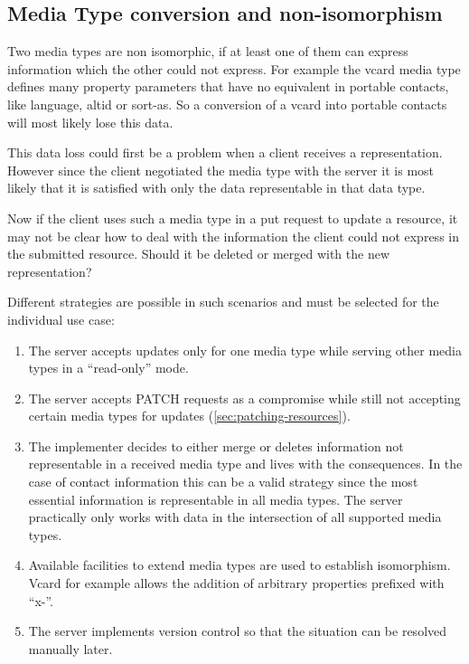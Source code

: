 \documentclass[12pt,a4paper,twoside]{scrartcl}		%
\begin{document}


\subsection{Media Type conversion and non-isomorphism}

Two media types are non isomorphic, if at least one of them can express
information which the other could not express. For example the vcard media type
defines many property parameters that have no equivalent in portable contacts,
like language, altid or sort-as. So a conversion of a vcard into portable
contacts will most likely lose this data.

This data loss could first be a problem when a client receives a
representation. However since the client negotiated the media type with the
server it is most likely that it is satisfied with only the data representable
in that data type.

Now if the client uses such a media type in a put request to update a resource,
it may not be clear how to deal with the information the client could not
express in the submitted resource. Should it be deleted or merged with the new
representation?

Different strategies are possible in such scenarios and must be selected for the
individual use case:

\begin{enumerate}
\item The server accepts updates only for one media type while serving other
  media types in a ``read-only'' mode.
\item The server accepts PATCH requests\cite{RFC5789} as a compromise while
  still not accepting certain media types for updates
  (\autoref{sec:patching-resources}).
\item The implementer decides to either merge or deletes information not
  representable in a received media type and lives with the consequences. In the
  case of contact information this can be a valid strategy since the most
  essential information is representable in all media types. The server
  practically only works with data in the intersection of all supported media
  types.
\item Available facilities to extend media types are used to establish
  isomorphism. Vcard for example allows the addition of arbitrary properties
  prefixed with ``x-''.
\item The server implements version control so that the situation can be
  resolved manually later.
\end{enumerate}
\end{document}
